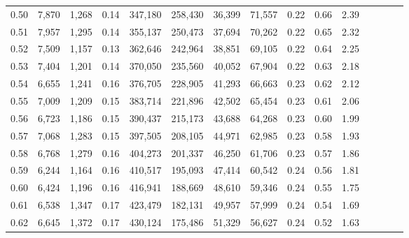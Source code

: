 \begin{tabular}{rrrcrrrrrrrrrrr}
0.50 &   7,870 &   1,268 &                                       0.14 &  347,180 &  258,430 &   36,399 &   71,557 &  0.22 &  0.66 &                         2.39 \\
0.51 &   7,957 &   1,295 &                                       0.14 &  355,137 &  250,473 &   37,694 &   70,262 &  0.22 &  0.65 &                         2.32 \\
0.52 &   7,509 &   1,157 &                                       0.13 &  362,646 &  242,964 &   38,851 &   69,105 &  0.22 &  0.64 &                         2.25 \\
0.53 &   7,404 &   1,201 &                                       0.14 &  370,050 &  235,560 &   40,052 &   67,904 &  0.22 &  0.63 &                         2.18 \\
0.54 &   6,655 &   1,241 &                                       0.16 &  376,705 &  228,905 &   41,293 &   66,663 &  0.23 &  0.62 &                         2.12 \\
0.55 &   7,009 &   1,209 &                                       0.15 &  383,714 &  221,896 &   42,502 &   65,454 &  0.23 &  0.61 &                         2.06 \\
0.56 &   6,723 &   1,186 &                                       0.15 &  390,437 &  215,173 &   43,688 &   64,268 &  0.23 &  0.60 &                         1.99 \\
0.57 &   7,068 &   1,283 &                                       0.15 &  397,505 &  208,105 &   44,971 &   62,985 &  0.23 &  0.58 &                         1.93 \\
0.58 &   6,768 &   1,279 &                                       0.16 &  404,273 &  201,337 &   46,250 &   61,706 &  0.23 &  0.57 &                         1.86 \\
0.59 &   6,244 &   1,164 &                                       0.16 &  410,517 &  195,093 &   47,414 &   60,542 &  0.24 &  0.56 &                         1.81 \\
0.60 &   6,424 &   1,196 &                                       0.16 &  416,941 &  188,669 &   48,610 &   59,346 &  0.24 &  0.55 &                         1.75 \\
0.61 &   6,538 &   1,347 &                                       0.17 &  423,479 &  182,131 &   49,957 &   57,999 &  0.24 &  0.54 &                         1.69 \\
0.62 &   6,645 &   1,372 &                                       0.17 &  430,124 &  175,486 &   51,329 &   56,627 &  0.24 &  0.52 &                         1.63 \\

\end{tabular}

